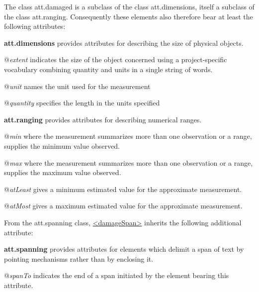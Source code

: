  The class \textsf{att.damaged} is a subclass of the class \textsf{att.dimensions}, itself a subclass of the class \textsf{att.ranging}. Consequently these elements also therefore bear at least the following attributes: 
\begin{sansreflist}
  
\item [\textbf{att.dimensions}] provides attributes for describing the size of physical objects.\hfil\\[-10pt]\begin{sansreflist}
    \item[@{\itshape extent}]
  indicates the size of the object concerned using a project-specific vocabulary combining quantity and units in a single string of words.
    \item[@{\itshape unit}]
  names the unit used for the measurement
    \item[@{\itshape quantity}]
  specifies the length in the units specified
\end{sansreflist}  
\item [\textbf{att.ranging}] provides attributes for describing numerical ranges.\hfil\\[-10pt]\begin{sansreflist}
    \item[@{\itshape min}]
  where the measurement summarizes more than one observation or a range, supplies the minimum value observed.
    \item[@{\itshape max}]
  where the measurement summarizes more than one observation or a range, supplies the maximum value observed.
    \item[@{\itshape atLeast}]
  gives a minimum estimated value for the approximate measurement.
    \item[@{\itshape atMost}]
  gives a maximum estimated value for the approximate measurement.
\end{sansreflist}  
\end{sansreflist}
 From the \textsf{att.spanning} class, \hyperref[TEI.damageSpan]{<damageSpan>} inherits the following additional attribute: 
\begin{sansreflist}
  
\item [\textbf{att.spanning}] provides attributes for elements which delimit a span of text by pointing mechanisms rather than by enclosing it.\hfil\\[-10pt]\begin{sansreflist}
    \item[@{\itshape spanTo}]
  indicates the end of a span initiated by the element bearing this attribute.
\end{sansreflist}  
\end{sansreflist}
